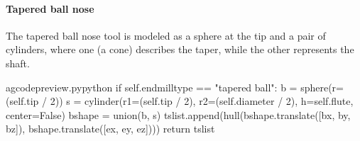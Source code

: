 \documentclass{ltxdoc}
\begin{document}
\paragraph{Tapered ball nose}

The tapered ball nose tool is modeled as a sphere at the tip and a pair of cylinders, where one (a cone) describes the taper, while the other represents the shaft.

\lstset{firstnumber=\thegcpy}
\begin{writecode}{a}{gcodepreview.py}{python}
        if self.endmilltype == "tapered ball":
            b = sphere(r=(self.tip / 2))
            s = cylinder(r1=(self.tip / 2), r2=(self.diameter / 2), h=self.flute, center=False)
            bshape = union(b, s)
            tslist.append(hull(bshape.translate([bx, by, bz]), bshape.translate([ex, ey, ez])))
            return tslist

\end{writecode}
\addtocounter{gcpy}{7}

%
%
%

%
%
\end{document}
